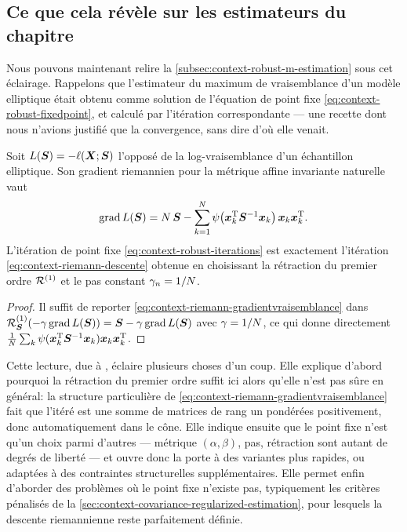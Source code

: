 \subsection{Ce que cela révèle sur les estimateurs du chapitre}

Nous pouvons maintenant relire la \cref{subsec:context-robust-m-estimation} sous cet éclairage. Rappelons que l'estimateur du maximum de vraisemblance d'un modèle elliptique était obtenu comme solution de l'équation de point fixe \cref{eq:context-robust-fixedpoint}, et calculé par l'itération correspondante --- une recette dont nous n'avions justifié que la convergence, sans dire d'où elle venait.

\begin{property}
\label{prop:context-riemann-pointfixe}
  Soit $L(\boldsymbol{S})=-\ell(\boldsymbol{X};\boldsymbol{S})$ l'opposé de la log-vraisemblance d'un échantillon elliptique. Son gradient riemannien pour la métrique affine invariante naturelle vaut
  \begin{equation}
    \operatorname{\operatorname{grad}} L(\boldsymbol{S})
    =
    N\,\boldsymbol{S}
    -
    \sum_{k=1}^{N}
      \psi\!\left(\boldsymbol{x}_k^{\mathrm{T}} {\boldsymbol{S}}^{-1} \boldsymbol{x}_k\right)\boldsymbol{x}_k\boldsymbol{x}_k^{\mathrm{T}} .
    \label{eq:context-riemann-gradientvraisemblance}
  \end{equation}
  L'itération de point fixe \cref{eq:context-robust-iterations} est exactement l'itération \cref{eq:context-riemann-descente} obtenue en choisissant la rétraction du premier ordre $\mathcal{R}^{(1)}$ et le pas constant $\gamma_n=1/N$.
\end{property}

\begin{proof}
  Il suffit de reporter \cref{eq:context-riemann-gradientvraisemblance} dans $\mathcal{R}^{(1)}_{\boldsymbol{S}}(-\gamma\operatorname{\operatorname{grad}} L(\boldsymbol{S}))=\boldsymbol{S}-\gamma\operatorname{\operatorname{grad}} L(\boldsymbol{S})$ avec $\gamma=1/N$, ce qui donne directement $\frac{1}{N}\sum_k\psi(\boldsymbol{x}_k^{\mathrm{T}} {\boldsymbol{S}}^{-1} \boldsymbol{x}_k)\boldsymbol{x}_k\boldsymbol{x}_k^{\mathrm{T}}$.
\end{proof}

\begin{remark}
  Cette lecture, due à , éclaire plusieurs choses d'un coup. Elle explique d'abord pourquoi la rétraction du premier ordre suffit ici alors qu'elle n'est pas sûre en général: la structure particulière de \cref{eq:context-riemann-gradientvraisemblance} fait que l'itéré est une somme de matrices de rang un pondérées positivement, donc automatiquement dans le cône. Elle indique ensuite que le point fixe n'est qu'un choix parmi d'autres --- métrique $(\alpha,\beta)$, pas, rétraction sont autant de degrés de liberté --- et ouvre donc la porte à des variantes plus rapides, ou adaptées à des contraintes structurelles supplémentaires. Elle permet enfin d'aborder des problèmes où le point fixe n'existe pas, typiquement les critères pénalisés de la \cref{sec:context-covariance-regularized-estimation}, pour lesquels la descente riemannienne reste parfaitement définie.
\end{remark}

